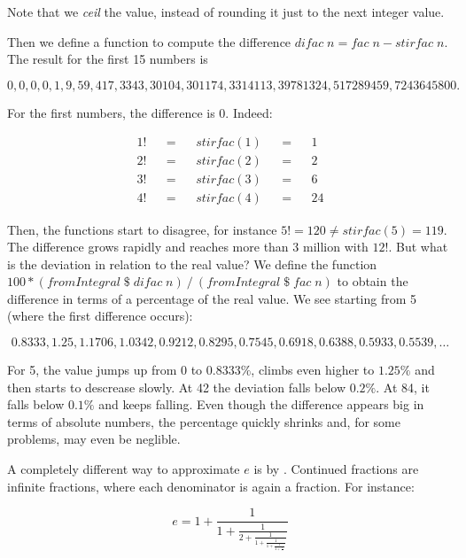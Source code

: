 \documentclass[tikz]{scrreprt}
\newcommand{\Varid}[1]{\mathit{#1}}
\begin{document}
Note that we \emph{ceil} the value, instead of
rounding it just to the next integer value.

Then we define a function to compute the difference
\ensuremath{\Varid{difac}\;\Varid{n}\mathrel{=}\Varid{fac}\;\Varid{n}\mathbin{-}\Varid{stirfac}\;\Varid{n}}.
The result for the first 15 numbers is

\[
0,0,0,0,1,9,59,417,3343,30104,301174,3314113,39781324,517289459,7243645800.
\]

For the first numbers, the difference is 0. Indeed:

\begin{align*}
1! && = && stirfac(1) && = && 1\\
2! && = && stirfac(2) && = && 2\\
3! && = && stirfac(3) && = && 6\\
4! && = && stirfac(4) && = && 24
\end{align*}

Then, the functions start to disagree,
for instance $5! = 120 \neq stirfac(5) = 119$.
The difference grows rapidly and reaches more
than 3 million with $12!$. But what is the deviation
in relation to the real value?
We define the function 
\ensuremath{\mathrm{100}\mathbin{*}(\Varid{fromIntegral}\mathbin{\$}\Varid{difac}\;\Varid{n})\mathbin{/}(\Varid{fromIntegral}\mathbin{\$}\Varid{fac}\;\Varid{n})}
to obtain the difference in terms of a percentage
of the real value. We see starting from 5
(where the first difference occurs):

\[
0.8333,
1.25,
1.1706,
1.0342,
0.9212,
0.8295,
0.7545,
0.6918,
0.6388,
0.5933,
0.5539,\dots
\]

For 5, the value jumps up from 0 to $0.8333\%$,
climbs even higher to $1.25\%$ and then starts
to descrease slowly.
At 42 the deviation falls below $0.2\%$.
At 84, it falls below $0.1\%$ and keeps falling.
Even though the difference appears big
in terms of absolute numbers, the percentage
quickly shrinks and, for some problems, may
even be neglible.

A completely different way to approximate $e$
is by .
Continued fractions are infinite fractions,
where each denominator is again a fraction.
For instance:

\begin{equation}
  e =  1 + \frac{1}{
         1 + \frac{1}{
           2 + \frac{1}{
             1 + \frac{1}{
               1 + \frac{1}{
                 4 + \frac{1}{\dots}}}}}}
\end{equation}
\end{document}

